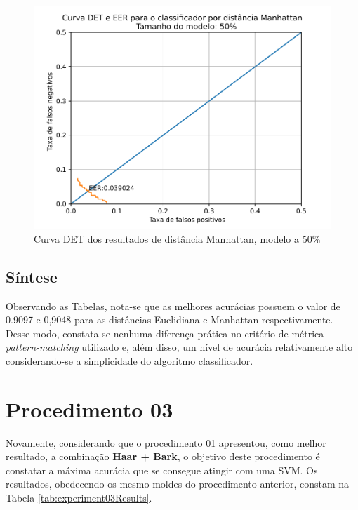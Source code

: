 			\begin{figure}[ht]
				\centering
				\includegraphics[width=\linewidth]{images/results/det/DET_for_classifier_Manhattan_50}
				\caption{Curva DET dos resultados de distância Manhattan, modelo a 50\%}
				\label{fig:detforclassifiermanhattan50}
			\end{figure}
			
		\subsection{Síntese}
			\par Observando as Tabelas, nota-se que as melhores acurácias possuem o valor de 0.9097 e 0,9048 para as distâncias Euclidiana e Manhattan respectivamente.  Desse modo, constata-se nenhuma diferença prática no critério de métrica \textit{pattern-matching} utilizado e, além disso, um nível de acurácia relativamente alto considerando-se a simplicidade do algoritmo classificador.

			\forceNewPage
	\section{Procedimento 03}
		\label{chap:testsResults:sec:Experimento03}
		\par Novamente, considerando que o procedimento 01 apresentou, como melhor resultado, a combinação \textbf{Haar + Bark}, o objetivo deste procedimento é constatar a máxima acurácia que se consegue atingir com uma SVM. Os resultados, obedecendo os mesmo moldes do procedimento anterior, constam na Tabela \ref{tab:experiment03Results}. 
		
